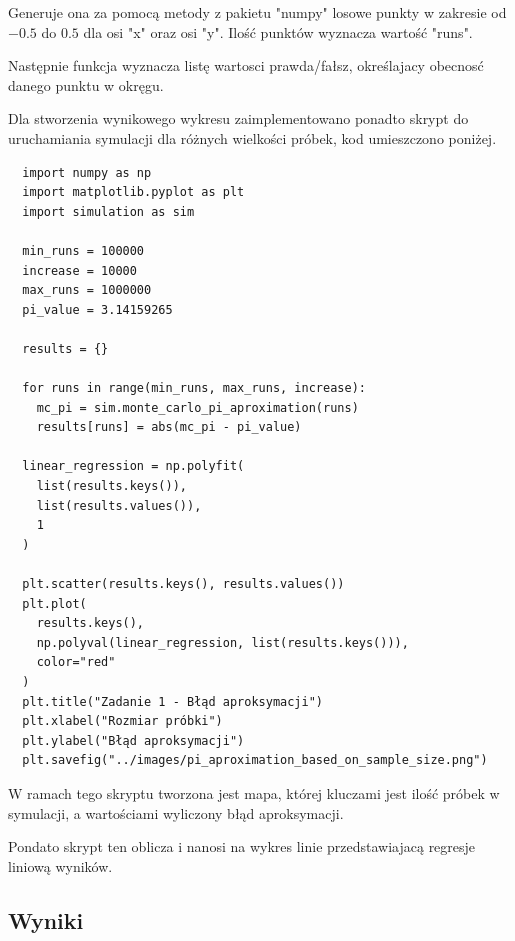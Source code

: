 \documentclass[12pt,oneside,a4paper]{book} %
\theoremstyle{break}
\begin{document}
Generuje ona za pomocą metody z pakietu "numpy" losowe punkty w zakresie od $-0.5$ do $0.5$ dla osi "x" oraz osi "y". Ilość punktów wyznacza wartość "runs".

Następnie funkcja wyznacza listę wartosci prawda/fałsz, określajacy obecnosć danego punktu w okręgu.

Dla stworzenia wynikowego wykresu zaimplementowano ponadto skrypt do uruchamiania symulacji dla różnych wielkości próbek, kod umieszczono poniżej.

\begin{verbatim}
  import numpy as np
  import matplotlib.pyplot as plt
  import simulation as sim

  min_runs = 100000
  increase = 10000
  max_runs = 1000000
  pi_value = 3.14159265

  results = {}

  for runs in range(min_runs, max_runs, increase):
    mc_pi = sim.monte_carlo_pi_aproximation(runs)
    results[runs] = abs(mc_pi - pi_value)

  linear_regression = np.polyfit(
    list(results.keys()), 
    list(results.values()), 
    1
  )

  plt.scatter(results.keys(), results.values())
  plt.plot(
    results.keys(), 
    np.polyval(linear_regression, list(results.keys())), 
    color="red"
  )
  plt.title("Zadanie 1 - Błąd aproksymacji")
  plt.xlabel("Rozmiar próbki")
  plt.ylabel("Błąd aproksymacji")
  plt.savefig("../images/pi_aproximation_based_on_sample_size.png")
\end{verbatim}

W ramach tego skryptu tworzona jest mapa, której kluczami jest ilość próbek w symulacji, a wartościami wyliczony błąd aproksymacji.

Pondato skrypt ten oblicza i nanosi na wykres linie przedstawiajacą regresje liniową wyników.

\newpage
\subsection*{Wyniki}
\end{document}
